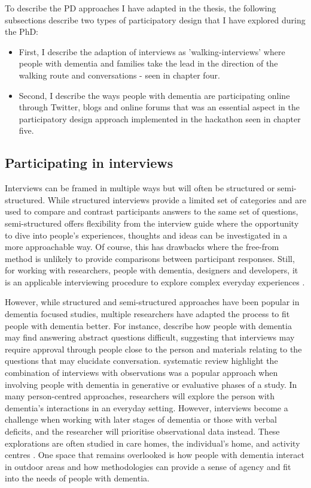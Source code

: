To describe the PD approaches I have adapted in the thesis, the following subsections describe two types of participatory design that I have explored during the PhD: 
\begin{itemize}
    
\item First, I describe the adaption of interviews as 'walking-interviews' where people with dementia and families take the lead in the direction of the walking route and conversations - seen in chapter four.
\item Second, I describe the ways people with dementia are participating online through Twitter, blogs and online forums that was an essential aspect in the participatory design approach implemented in the hackathon seen in chapter five. 
\end{itemize}

\subsection{Participating in interviews}
\label{PD:Interviews}
Interviews can be framed in multiple ways but will often be structured or semi-structured. While structured interviews provide a limited set of categories and are used to compare and contrast participants answers to the same set of questions, semi-structured offers flexibility from the interview guide where the opportunity to dive into people's experiences, thoughts and ideas can be investigated in a more approachable way. Of course, this has drawbacks where the free-from method is unlikely to provide comparisons between participant responses. Still, for working with researchers, people with dementia, designers and developers, it is an applicable interviewing procedure to explore complex everyday experiences \citep{horton2004qualitative}.

However, while structured and semi-structured approaches have been popular in dementia focused studies, multiple researchers have adapted the process to fit people with dementia better. For instance, \cite{mayer2013lessons} describe how people with dementia may find answering abstract questions difficult, suggesting that interviews may require approval through people close to the person and materials relating to the questions that may elucidate conversation. \cite{suijkerbuijk_active_2019} systematic review highlight the combination of interviews with observations was a popular approach when involving people with dementia in generative or evaluative phases of a study. In many person-centred approaches, researchers will explore the person with dementia's interactions in an everyday setting. However, interviews become a challenge when working with later stages of dementia or those with verbal deficits, and the researcher will prioritise observational data instead. These explorations are often studied in care homes, the individual's home, and activity centres \cite{keady_involving_2007,wallace_enabling_2012-1}. One space that remains overlooked is how people with dementia interact in outdoor areas and how methodologies can provide a sense of agency and fit into the needs of people with dementia. 

